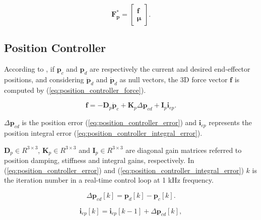 \begin{equation}
    \label{eq:task_force_matrix_notation}
    \boldsymbol{F^*_p} = \begin{bmatrix}
    \boldsymbol{f}\\
    \boldsymbol{\mu}
    \end{bmatrix}.
\end{equation}

\subsection{Position Controller}
\label{subsec:control_architectures_cartesian_impedance_posture_optimisation_position_controller}

According to \citeauthor{Ochoa2019_control_architecture_robotic_polishing} \cite{Ochoa2019_control_architecture_robotic_polishing}, if $\boldsymbol{p}_c$ and $\boldsymbol{p}_d$ are respectively the current and desired end-effector positions, and considering $\ddot{\boldsymbol{p}}_d$ and $\dot{\boldsymbol{p}}_d$ as null vectors, the 3D force vector $\boldsymbol{f}$ is computed by (\ref{eq:position_controller_force}).

\begin{equation}
    \label{eq:position_controller_force}
    \boldsymbol{f} = -\boldsymbol{D}_p \dot{\boldsymbol{p}}_c + \boldsymbol{K}_p \Delta \boldsymbol{p}_{cd} + \boldsymbol{I}_p \boldsymbol{i}_{ep}.
\end{equation}

$\Delta \boldsymbol{p}_{cd}$ is the position error (\ref{eq:position_controller_error}) and $\boldsymbol{i}_{ep}$ represents the position integral error (\ref{eq:position_controller_integral_error}).

$\boldsymbol{D}_p \in R^{3\times3}$, $\boldsymbol{K}_p \in R^{3\times3}$ and $\boldsymbol{I}_p \in R^{3\times3}$ are diagonal gain matrices referred to position damping, stiffness and integral gains, respectively. In (\ref{eq:position_controller_error}) and (\ref{eq:position_controller_integral_error}) $k$ is the iteration number in a real-time control loop at 1 kHz frequency.

\begin{equation}
    \label{eq:position_controller_error}
    \Delta \boldsymbol{p}_{cd}[k] = \boldsymbol{p}_d[k] - \boldsymbol{p}_c[k].
\end{equation}

\begin{equation}
    \label{eq:position_controller_integral_error}
    \boldsymbol{i}_{ep}[k] = \boldsymbol{i}_{ep}[k-1] + \Delta \boldsymbol{p}_{cd}[k],
\end{equation}

